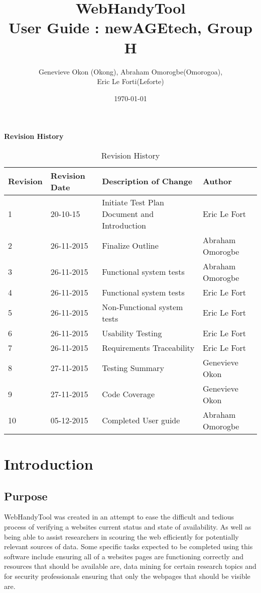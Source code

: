 \documentclass[12pt, titlepage]{article}
\begin{document}
\title{WebHandyTool \\
 User Guide : newAGEtech, Group H }
\author{Genevieve Okon (Okong), Abraham Omorogbe(Omorogoa),\\
 Eric Le Forti(Leforte)}
\date{\today}
\maketitle

\tableofcontents
\listoftables
\pagebreak

\begin{center}\textbf{Revision History}\end{center}
\begin{table}[h!]
\centering
	\begin{tabular}{| p{1.5cm} | p{2.5cm} | p{7cm} |p{3cm} |}    \hline
	Revision  &Revision Date &Description of Change &Author\\ \hline
	1& 20-10-15 &Initiate Test Plan Document  and Introduction&Eric Le Fort\\ \hline
	2&26-11-2015&Finalize Outline & Abraham Omorogbe\\ \hline	
3&26-11-2015&Functional system tests& Abraham Omorogbe\\ \hline
4&26-11-2015&Functional system tests& Eric Le Fort\\ \hline
5&26-11-2015&Non-Functional system tests& Eric Le Fort\\ \hline
6 &26-11-2015&Usability Testing & Eric Le Fort\\ \hline
7& 26-11-2015& Requirements Traceability & Eric Le Fort\\ \hline
8& 27-11-2015 &Testing Summary& Genevieve Okon\\ \hline
9& 27-11-2015 &Code Coverage& Genevieve Okon\\ \hline
10& 05-12-2015 &Completed User guide & Abraham Omorogbe\\ \hline

	
       \end{tabular}
       \caption{Revision History}
       \label{table:Revision History}
\end{table}
\pagebreak
\section{Introduction}
\subsection{Purpose}
WebHandyTool was created in an attempt to ease the difficult and tedious process of verifying a websites current status and state of availability. As well as being able to assist researchers in scouring the web efficiently for potentially relevant sources of data. Some specific tasks expected to be completed using this software include ensuring all of a websites pages are functioning correctly and resources that should be available are, data mining for certain research topics and for security professionals ensuring that only the webpages that should be visible are. 
\end{document}
